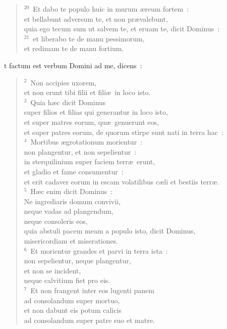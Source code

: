 \begin{flushleft}
\begin{verse}
${}^{20}$~Et dabo te populo huic in murum \ae reum fortem~:\\ et bellabunt adversum te, et non pr\ae valebunt,\\ quia ego tecum sum ut salvem te, et eruam te, dicit Dominus~:\\
${}^{21}$~et liberabo te de manu pessimorum,\\ et redimam te de manu fortium.\end{verse}\end{flushleft}



\bchapter
{}t factum est verbum Domini ad me, dicens~:
\begin{flushleft}\begin{verse}\vspace{6pt}${}^{2}$~Non accipies uxorem,\\ et non erunt tibi filii et fili\ae\ in loco isto.\\
${}^{3}$~Quia h\ae c dicit Dominus\\ super filios et filias qui generantur in loco isto,\\ et super matres eorum, qu\ae\ genuerunt eos,\\ et super patres eorum, de quorum stirpe sunt nati in terra hac~:\\
${}^{4}$~Mortibus \ae grotationum morientur~:\\ non plangentur, et non sepelientur~:\\ in sterquilinium super faciem terr\ae\ erunt,\\ et gladio et fame consumentur~:\\ et erit cadaver eorum in escam volatilibus c\ae li et bestiis terr\ae .\\
${}^{5}$~H\ae c enim dicit Dominus~:\\ Ne ingrediaris domum convivii,\\ neque vadas ad plangendum,\\ neque consoleris eos,\\ quia abstuli pacem meam a populo isto, dicit Dominus,\\ misericordiam et miserationes.\\
${}^{6}$~Et morientur grandes et parvi in terra ista~:\\ non sepelientur, neque plangentur,\\ et non se incident,\\ neque calvitium fiet pro eis.\\
${}^{7}$~Et non frangent inter eos lugenti panem\\ ad consolandum super mortuo,\\ et non dabunt eis potum calicis\\ ad consolandum super patre suo et matre.\\

\end{verse}
\end{flushleft}
